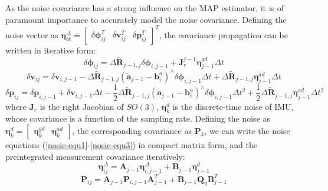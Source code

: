 \documentclass[journal,article,submit,moreauthors,pdftex]{Definitions/mdpi}
\begin{document}
As the noise covariance has a strong influence on the MAP estimator, it is of paramount importance to accurately model the noise covariance. Defining the noise vector as $ \boldsymbol{\eta}_{ik}^{\Delta} \doteq \left[\begin{matrix} \delta{\boldsymbol{\phi}_{ij}^T} & \delta{\boldsymbol{v}_{ij}^T} & \delta{\boldsymbol{p}_{ij}^T} \end{matrix}\right]^T $, the covariance propagation can be written in iterative form:
\begin{equation}
	\delta{\boldsymbol{\phi}_{ij}} = \Delta{\widetilde{\boldsymbol{R}}_{j-1,j}}\delta{\boldsymbol{\phi}_{i,j-1}} + \boldsymbol{J}_r^{j-1} \boldsymbol{\eta}_{j-1}^{gd}\Delta{t} 
	\label{nosie-equ1}
\end{equation}
\begin{equation}
	\delta{\boldsymbol{v}_{ij}} = \delta{\boldsymbol{v}_{i,j-1}} - \Delta{\widetilde{\boldsymbol{R}}_{j-1,j}}(\widetilde{\boldsymbol{a}}_{j-1}-\boldsymbol{b}_i^a)^{\land}\delta{\boldsymbol{\phi}_{i,j-1}}\Delta{t} + \Delta{\widetilde{\boldsymbol{R}}_{j-1,j}}\boldsymbol{\eta}_{j-1}^{ad}\Delta{t}
	\label{nosie-equ2}
\end{equation}
\begin{equation}
	\delta{\boldsymbol{p}_{ij}} = \delta{\boldsymbol{p}_{i,j-1}} + \delta{\boldsymbol{v}_{i,j-1}}\Delta{t}  - 
	\frac{1}{2}\Delta{\widetilde{\boldsymbol{R}}_{j-1,j}}(\widetilde{\boldsymbol{a}}_{j-1}-\boldsymbol{b}_i^a)^{\land}\delta{\boldsymbol{\phi}_{i,j-1}}\Delta{t}^2 + 
	\frac{1}{2}\Delta{\widetilde{\boldsymbol{R}}_{j-1,j}}\boldsymbol{\eta}_{j-1}^{ad}\Delta{t}^2
	\label{nosie-equ3}
\end{equation}
where $\boldsymbol{J}_r$ is the right Jacobian of $SO(3)$, $\boldsymbol{\eta}_{k}^{d}$ is the  discrete-time noise of IMU, whose covariance is a function of the sampling rate. Defining the noise as $\boldsymbol{\eta}_{k}^{d} = \left[ \begin{matrix} \boldsymbol{\eta}_{k}^{gd} & \boldsymbol{\eta}_{k}^{ad}\end{matrix}\right]$, the corresponding covariance as $\boldsymbol{P}_{k}$, we can write the noise equations (\ref{nosie-equ1}-\ref{nosie-equ3}) in compact matrix form, and the preintegrated measurement covariance iteratively:
\begin{equation}
	\boldsymbol{\eta}_{ij}^{\Delta} = \boldsymbol{A}_{j-1}\boldsymbol{\eta}_{i,j-1}^{\Delta} + \boldsymbol{B}_{j-1} \boldsymbol{\eta}_{j-1}^{d}
\end{equation}
\begin{equation}
	\boldsymbol{P}_{ij} = \boldsymbol{A}_{j-1}\boldsymbol{P}_{i,j-1}\boldsymbol{A}_{j-1}^T + \boldsymbol{B}_{j-1} \boldsymbol{Q}_{\eta} \boldsymbol{B}_{j-1}^T
\end{equation}
\end{document}
